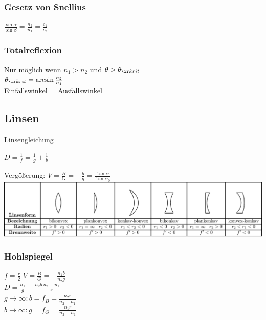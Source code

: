 \documentclass[german]{latex4ei/latex4ei_sheet}
\begin{document}
\subsubsection{Gesetz von Snellius}
$\frac{\sin \alpha}{\sin \beta} = \frac{n_2}{n_1} = \frac {c_1}{c_2}$
\subsubsection{Totalreflexion}
Nur möglich wenn $n_1 > n_2$ und $\theta > \theta_{\ir krit}$ \\
$\theta_{\ir krit} = \arcsin \frac{n_2}{n_1}$\\
Einfallswinkel = Ausfallswinkel


\subsection{Linsen}
Linsengleichung
\begin{emphbox}
$D=\frac{1}{f}=\frac{1}{g}+\frac{1}{b}$	
\end{emphbox}
Vergößerung: $V=\frac{B}{G}= - \frac{b}{g}=\frac{\tan \alpha}{\tan \alpha_0}$\\
\includegraphics[width=\columnwidth]{img/Linsen_crop.pdf}
\begin{sectionbox}
\subsubsection{Hohlspiegel}
$f=\frac{r}{2}$ \qquad $V=\frac{B}{G}= - \frac{n_1b}{n_2g}$ \\
$D=\frac{n_1}{g}+\frac{n_2b}=\frac{n_2-n_1}{r}$\\
$g\rightarrow \infty: b=f_B=\frac{n_2r}{n_2-n_1}$\\
$b\rightarrow \infty: g=f_G=\frac{n_1r}{n_2-n_1}$\\
\end{sectionbox}
\end{document}
